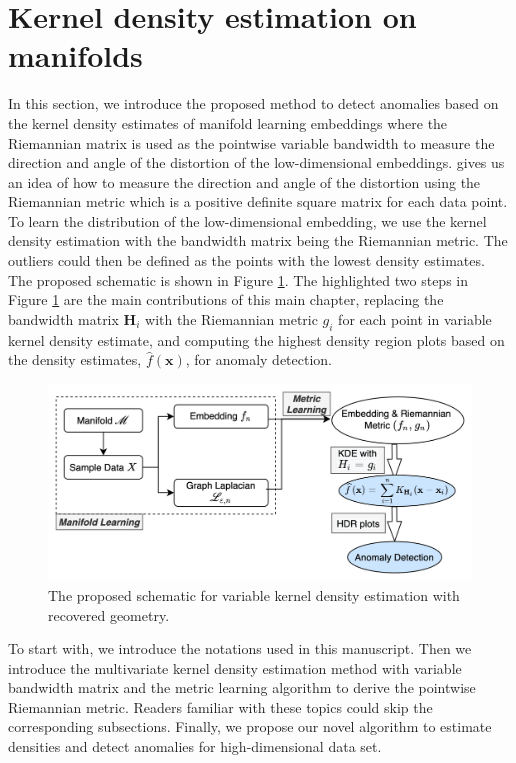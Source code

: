 \documentclass[11pt,a4paper,]{article}
\begin{document}
\hypertarget{vkde}{%
\section{Kernel density estimation on manifolds}\label{vkde}}

In this section, we introduce the proposed method to detect anomalies based on the kernel density estimates of manifold learning embeddings where the Riemannian matrix is used as the pointwise variable bandwidth to measure the direction and angle of the distortion of the low-dimensional embeddings. \textcite{Perrault-Joncas2013-pq} gives us an idea of how to measure the direction and angle of the distortion using the Riemannian metric which is a positive definite square matrix for each data point. To learn the distribution of the low-dimensional embedding, we use the kernel density estimation with the bandwidth matrix being the Riemannian metric. The outliers could then be defined as the points with the lowest density estimates. The proposed schematic is shown in Figure \ref{fig:vkde}. The highlighted two steps in Figure \ref{fig:vkde} are the main contributions of this main chapter, replacing the bandwidth matrix \(\pmb{H}_i\) with the Riemannian metric \(g_i\) for each point in
variable kernel density estimate, and computing the highest density region plots based on the density estimates, \(\hat{f}(\pmb{x})\), for anomaly detection.



\begin{figure}

{\centering \includegraphics[width=0.95\linewidth]{figures/vkde} 

}

\caption{The proposed schematic for variable kernel density estimation with recovered geometry.}\label{fig:vkde}
\end{figure}

To start with, we introduce the notations used in this manuscript. Then we introduce the multivariate kernel density estimation method with variable bandwidth matrix and the metric learning algorithm to derive the pointwise Riemannian metric. Readers familiar with these topics could skip the corresponding subsections. Finally, we propose our novel algorithm to estimate densities and detect anomalies for high-dimensional data set.
\end{document}
